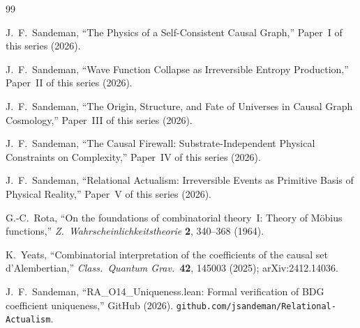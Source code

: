 \documentclass[12pt,a4paper]{article}
\begin{document}
\begin{thebibliography}{99}

 J.~F.~Sandeman, ``The Physics of a Self-Consistent Causal Graph,'' Paper~I of this series (2026).

 J.~F.~Sandeman, ``Wave Function Collapse as Irreversible Entropy Production,'' Paper~II of this series (2026).

 J.~F.~Sandeman, ``The Origin, Structure, and Fate of Universes in Causal Graph Cosmology,'' Paper~III of this series (2026).

 J.~F.~Sandeman, ``The Causal Firewall: Substrate-Independent Physical Constraints on Complexity,'' Paper~IV of this series (2026).

 J.~F.~Sandeman, ``Relational Actualism: Irreversible Events as Primitive Basis of Physical Reality,'' Paper~V of this series (2026).

 G.-C.~Rota, ``On the foundations of combinatorial theory~I: Theory of M\"obius functions,'' \emph{Z.\ Wahrscheinlichkeitstheorie} \textbf{2}, 340--368 (1964).

 K.~Yeats, ``Combinatorial interpretation of the coefficients of the causal set d'Alembertian,'' \emph{Class.\ Quantum Grav.}\ \textbf{42}, 145003 (2025); arXiv:2412.14036.

 J.~F.~Sandeman, ``RA\_O14\_Uniqueness.lean: Formal verification of BDG coefficient uniqueness,'' GitHub (2026). \texttt{github.com/jsandeman/Relational-Actualism}.

\end{thebibliography}
\end{document}
